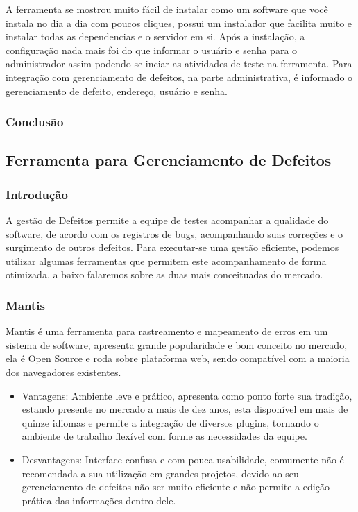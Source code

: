 \documentclass[12pt,a4paper]{article}
\begin{document}
			A ferramenta se mostrou muito fácil de instalar como um software que você instala no dia a dia com poucos cliques,
			possui um instalador que facilita muito e instalar todas as dependencias e o servidor em si. Após a instalação, a
			configuração nada mais foi do que informar o usuário e senha para o administrador assim podendo-se inciar as
			atividades de teste na ferramenta. Para integração com gerenciamento de defeitos, na parte administrativa, é
			informado o gerenciamento de defeito, endereço, usuário e senha. 
			
		\subsubsection{Conclusão}

	\clearpage		
	\subsection{Ferramenta para Gerenciamento de Defeitos}
		\subsubsection{Introdução}
		
			A gestão de Defeitos permite a equipe de testes acompanhar a qualidade do software, 
			de acordo com os registros de bugs, acompanhando suas correções e o surgimento de outros defeitos. 
			Para executar-se uma gestão eficiente, podemos utilizar algumas ferramentas que permitem este acompanhamento de forma otimizada, 
			a baixo falaremos sobre as duas mais conceituadas do mercado.
			
		\subsubsection{Mantis}
		
			Mantis é uma ferramenta para rastreamento e mapeamento de erros em um sistema de software, 
			apresenta grande popularidade e bom conceito no mercado, ela é Open Source e roda sobre plataforma web, 
			sendo compatível com a maioria dos navegadores existentes.

				\begin{itemize}
					\item Vantagens: 
						Ambiente leve e prático, apresenta como ponto forte sua tradição, estando presente no mercado a mais de dez anos, 
					  esta disponível em mais de quinze idiomas e permite a integração de diversos plugins, tornando o ambiente de trabalho flexível
					  com forme as necessidades da equipe. 					
					\item Desvantagens:
						Interface confusa e com pouca usabilidade, comumente não é recomendada a sua utilização em grandes projetos, 
						devido ao seu gerenciamento de defeitos não ser muito eficiente e não permite a edição prática das informações dentro dele. 
				\end{itemize}
						
\end{document}
